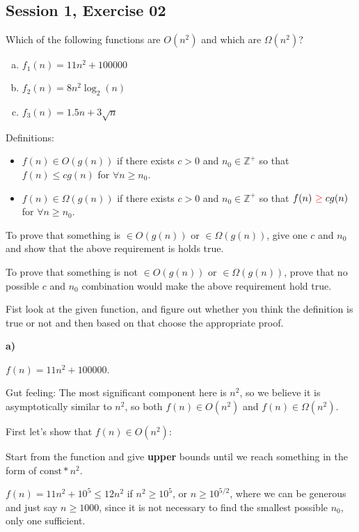 \subsection{Session 1, Exercise 02}


Which of the following functions are $O(n^2)$ and which are $\Omega(n^2)$?

\begin{enumerate}[a.)]
\item $f_1(n) = 11n^2 + 100000$
\item $f_2(n) = 8n^2\log_2(n)$
\item $f_3(n) = 1.5n + 3\sqrt{n}$
\end{enumerate}


Definitions:

\begin{itemize}
    \item $f(n)\in{}O(g(n))$ if there exists $c>0$ and $n_0\in{}\mathds{Z^+}$ so that $f(n) \leq{} cg(n)$ for $\forall{}n\geq{}n_0$.
    \item $f(n)\in{}\Omega(g(n))$ if there exists $c>0$ and $n_0\in{}\mathds{Z^+}$ so that $f(n)\text{ }\color{red}\mathbf{\geq{}}\color{black} cg(n)$ for $\forall{}n\geq{}n_0$.
\end{itemize}

To prove that something is $\in{}O(g(n))$ or $\in{}\Omega(g(n))$, give one $c$ and $n_0$ and show that the above requirement is holds true.

To prove that something is not $\in{}O(g(n))$ or $\in{}\Omega(g(n))$, prove that no possible $c$ and $n_0$ combination would make the above requirement hold true.

Fist look at the given function, and figure out whether you think the definition is true or not and then based on that choose the appropriate proof.

\textbf{a)}

$f(n) = 11n^2 + 100000$.

Gut feeling: The most significant component here is $n^2$, so we believe it is asymptotically similar to $n^2$, so both $f(n)\in{}O(n^2)$ and $f(n)\in{}\Omega(n^2)$.

First let's show that $f(n)\in{}O(n^2)$:

Start from the function and give \textbf{upper} bounds until we reach something in the form of $\text{const}*n^2$.

$f(n) = 11n^2 + 10^5 \leq{} 12n^2$ if $n^2 \geq{} 10^5$, or $n \geq{} 10^{5/2}$, where we can be generous and just say $n \geq{} 1000$, since it is not necessary to find the smallest possible $n_0$, only one sufficient.

